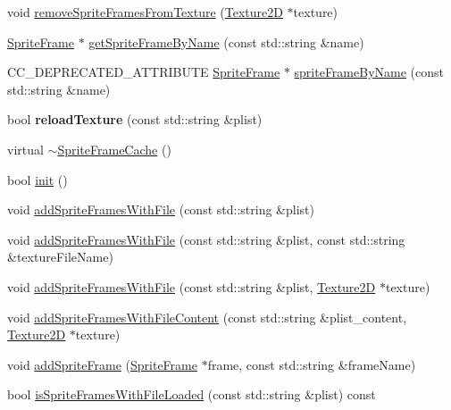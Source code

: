 \begin{DoxyCompactItemize}
\item 
void \hyperlink{classSpriteFrameCache_a410989581ec0f9da9914b512d672e2dc}{remove\+Sprite\+Frames\+From\+Texture} (\hyperlink{classTexture2D}{Texture2D} $\ast$texture)
\item 
\hyperlink{classSpriteFrame}{Sprite\+Frame} $\ast$ \hyperlink{classSpriteFrameCache_a36ba54daea85ff2c8a3dd6f3525eb17e}{get\+Sprite\+Frame\+By\+Name} (const std\+::string \&name)
\item 
C\+C\+\_\+\+D\+E\+P\+R\+E\+C\+A\+T\+E\+D\+\_\+\+A\+T\+T\+R\+I\+B\+U\+TE \hyperlink{classSpriteFrame}{Sprite\+Frame} $\ast$ \hyperlink{classSpriteFrameCache_a8118bf96fc4d957e3ed68f9990fb2d74}{sprite\+Frame\+By\+Name} (const std\+::string \&name)
\item 
\mbox{\label{classSpriteFrameCache_acc5c36275d0f4c28ba95d0c8846c5188}} 
bool {\bfseries reload\+Texture} (const std\+::string \&plist)
\item 
virtual \hyperlink{classSpriteFrameCache_aa1cbd30365b501ea6f44189b8eeaa686}{$\sim$\+Sprite\+Frame\+Cache} ()
\item 
bool \hyperlink{classSpriteFrameCache_a45438c56c17c4def48da6ee790c23c0e}{init} ()
\item 
void \hyperlink{classSpriteFrameCache_ad99267fc3a1f057d2efcbb43f75a9d2e}{add\+Sprite\+Frames\+With\+File} (const std\+::string \&plist)
\item 
void \hyperlink{classSpriteFrameCache_aec8dc209f1f9f297b319af67f0d8aa0c}{add\+Sprite\+Frames\+With\+File} (const std\+::string \&plist, const std\+::string \&texture\+File\+Name)
\item 
void \hyperlink{classSpriteFrameCache_a0cadaca840049f5009c7b2a288a9bd70}{add\+Sprite\+Frames\+With\+File} (const std\+::string \&plist, \hyperlink{classTexture2D}{Texture2D} $\ast$texture)
\item 
void \hyperlink{classSpriteFrameCache_a6288e49af5e6b3b052de916565923c32}{add\+Sprite\+Frames\+With\+File\+Content} (const std\+::string \&plist\+\_\+content, \hyperlink{classTexture2D}{Texture2D} $\ast$texture)
\item 
void \hyperlink{classSpriteFrameCache_ae4f777955e41dd502fff0f85370c730c}{add\+Sprite\+Frame} (\hyperlink{classSpriteFrame}{Sprite\+Frame} $\ast$frame, const std\+::string \&frame\+Name)
\item 
bool \hyperlink{classSpriteFrameCache_a9f5b03798546f9a18112feebe8e074eb}{is\+Sprite\+Frames\+With\+File\+Loaded} (const std\+::string \&plist) const
\item 

\end{DoxyCompactItemize}
